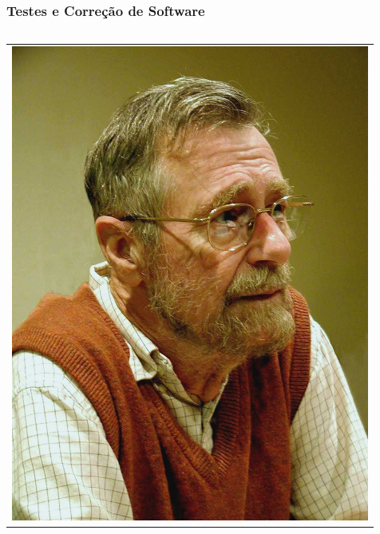 \documentclass{beamer}
\begin{document}
\begin{frame}
  \frametitle{Testes e Correção de Software}
	\begin{columns}[T]
		\begin{column}{.35\textwidth}
			\begin{tabular}{c}
				\includegraphics[scale=.1]{img/dijkstra.jpg} \\
			\end{tabular}
		\end{column}
		\begin{column}{.65\textwidth}
			\begin{quote}
			\end{quote}
		\end{column}
	\end{columns}
\end{frame}
\end{document}
